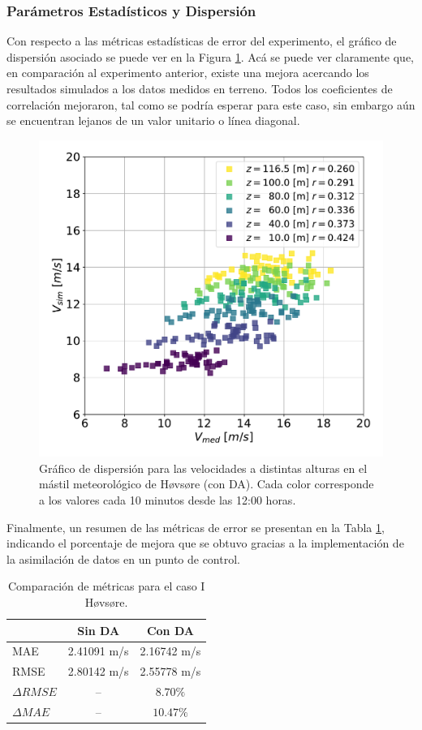 \subsubsection{Parámetros Estadísticos y Dispersión}
Con respecto a las métricas estadísticas de error del experimento, el gráfico de dispersión asociado se puede ver en la Figura \ref{fig:06_corr_hov_da}. Acá se puede ver claramente que, en comparación al experimento anterior, existe una mejora acercando los resultados simulados a los datos medidos en terreno. Todos los coeficientes de correlación mejoraron, tal como se podría esperar para este caso, sin embargo aún se encuentran lejanos de un valor unitario o línea diagonal.
\begin{figure}[H]
	\centering
	\includegraphics[width=0.55\linewidth,page=1,trim={0cm 0cm 0cm 0cm},clip]{Imagenes/06/hov_da/corr}%
	\caption{Gráfico de dispersión para las velocidades a distintas alturas en el mástil meteorológico de Høvsøre (con DA). Cada color corresponde a los valores cada 10 minutos desde las 12:00 horas.}
	\label{fig:06_corr_hov_da}
\end{figure}

Finalmente, un resumen de las métricas de error se presentan en la Tabla \ref{tab:06_hov_mae_rmse}, indicando el porcentaje de mejora que se obtuvo gracias a la implementación de la asimilación de datos en un punto de control.

\begin{table}[H]
	\caption{Comparación de métricas para el caso I Høvsøre.}
	\label{tab:06_hov_mae_rmse}
	\centering%
	\begin{tabular}{lcc}
		\toprule
		& Sin DA & Con DA \\
		\midrule
		MAE & 2.41091 m/s & 2.16742 m/s \\
		RMSE & 2.80142 m/s& 2.55778 m/s\\
		$\Delta{RMSE}$& --  & $8.70\%$  \\
		$\Delta{MAE}$ & -- & $10.47\%$  \\
		\bottomrule
	\end{tabular}
\end{table}

















